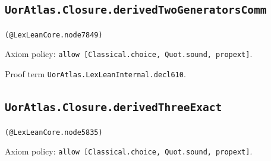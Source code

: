 \documentclass[11pt]{article}
\begin{document}
\subsection*{\texttt{UorAtlas.Closure.derivedTwoGeneratorsComm}}
\noindent\texttt{(@LexLeanCore.node7849)}\par
\noindent Axiom policy: \texttt{allow [Classical.choice, Quot.sound, propext]}.\par
\noindent Proof term \texttt{UorAtlas.LexLeanInternal.decl610}.\par
\subsection*{\texttt{UorAtlas.Closure.derivedThreeExact}}
\noindent\texttt{(@LexLeanCore.node5835)}\par
\noindent Axiom policy: \texttt{allow [Classical.choice, Quot.sound, propext]}.\par
\end{document}
